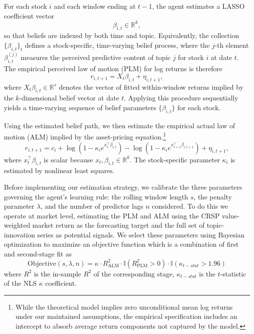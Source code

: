 \documentclass[11pt]{article}
\begin{document}
For each stock \(i\) and each window ending at \(t-1\), the agent estimates a LASSO
coefficient vector
\begin{equation}
\beta_{i,t} \in \mathbb{R}^{k},
\end{equation}
so that beliefs are indexed by both time and topic. Equivalently, the collection
\(\{\beta_{i,t}\}_t\) defines a stock-specific, time-varying belief process, where the
\(j\)-th element \(\beta_{i,t}^{(j)}\) measures the perceived predictive content of topic \(j\)
for stock \(i\) at date \(t\).
The empirical perceived law of motion (PLM) for log returns is therefore
\begin{equation}\label{eq:empirical_plm}
r_{i,t+1} = X_t \beta_{i,t} + \eta_{i,t+1},
\end{equation}
where \(X_t \beta_{i,t} \in \mathbb{R}^{s}\) denotes the vector of fitted within-window returns
implied by the \(k\)-dimensional belief vector at date \(t\).
Applying this procedure sequentially yields a time-varying sequence of belief parameters
\(\{\beta_{i,t}\}\) for each stock.

Using the estimated belief path, we then estimate the empirical actual law of motion
(ALM) implied by the asset-pricing equation.\footnote{While the theoretical model implies
zero unconditional mean log returns under our maintained assumptions, the empirical
specification includes an intercept to absorb average return components not captured by
the model.}
\begin{equation}\label{eq:empirical_alm}
r_{i,t+1}
= c_i
+ \log\!\left(1 - \kappa_i e^{x_t^\top \beta_{i,t}}\right)
- \log\!\left(1 - \kappa_i e^{x_{t+1}^\top \beta_{i,t+1}}\right)
+ \eta_{i,t+1},
\end{equation}
where \(x_t^\top \beta_{i,t}\) is scalar because \(x_t, \beta_{i,t} \in \mathbb{R}^{k}\).
The stock-specific parameter \(\kappa_i\) is estimated by nonlinear least squares.


Before implementing our estimation strategy, we calibrate the three parameters governing the agent’s learning rule: 
the rolling window length \(s\), the penalty parameter \(\lambda\), and the number of predictor lags \(n\) considered.
To do this we operate at market level, estimating the PLM and ALM using the CRSP value-weighted market return as the forecasting target and the full set of topic-innovation series as potential signals.
We select these parameters using Bayesian optimization to maximize an objective function which is a combination of first and second-stage fit as
\[ \text{Objective}(s, \lambda, n)
= \kappa \cdot
R^2_{\text{ALM}} \cdot \mathbb{I}\left(R^2_{\text{PLM}} > 0\right) \cdot \mathbb{I}\left(\kappa_{t-stat} > 1.96\right) \] 
where \(R^2_{}\) is the in-sample \(R^2\) of the corresponding stage,
\(\kappa_{t-stat}\) is the \(t\)-statistic of the NLS $\kappa$ coefficient.
\end{document}
